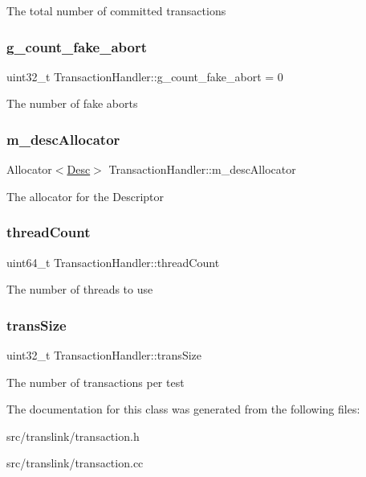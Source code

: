 The total number of committed transactions \mbox{\label{classTransactionHandler_a543da4f34515c10c92fcccd764dc2440}} 
\subsubsection{\texorpdfstring{g\+\_\+count\+\_\+fake\+\_\+abort}{g\_count\_fake\_abort}}
{\footnotesize\ttfamily uint32\+\_\+t Transaction\+Handler\+::g\+\_\+count\+\_\+fake\+\_\+abort = 0}

The number of fake aborts \mbox{\label{classTransactionHandler_a819bfbeebff4d0d591dd71e3890cfb5c}} 
\subsubsection{\texorpdfstring{m\+\_\+desc\+Allocator}{m\_descAllocator}}
{\footnotesize\ttfamily Allocator$<$\hyperlink{structDesc}{Desc}$>$ Transaction\+Handler\+::m\+\_\+desc\+Allocator}

The allocator for the Descriptor \mbox{\label{classTransactionHandler_aa836fefbe472dc6db2915ea723f148ef}} 
\subsubsection{\texorpdfstring{thread\+Count}{threadCount}}
{\footnotesize\ttfamily uint64\+\_\+t Transaction\+Handler\+::thread\+Count}

The number of threads to use \mbox{\label{classTransactionHandler_a9a2c1b281ece3123c6a18fc85a335ce4}} 
\subsubsection{\texorpdfstring{trans\+Size}{transSize}}
{\footnotesize\ttfamily uint32\+\_\+t Transaction\+Handler\+::trans\+Size}

The number of transactions per test 

The documentation for this class was generated from the following files\+:\begin{DoxyCompactItemize}
\item 
src/translink/transaction.\+h\item 
src/translink/transaction.\+cc\end{DoxyCompactItemize}
